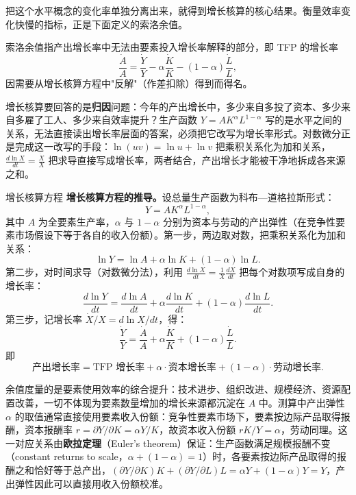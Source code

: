把这个水平概念的变化率单独分离出来，就得到增长核算的核心结果。衡量效率变化快慢的指标，正是下面定义的索洛余值。

\begin{definition}
索洛余值指产出增长率中无法由要素投入增长率解释的部分，即 TFP 的增长率
\[
\frac{\dot A}{A} = \frac{\dot Y}{Y} - \alpha\frac{\dot K}{K} - (1-\alpha)\frac{\dot L}{L},
\]
因需要从增长核算方程中"反解"（作差扣除）得到而得名。
\end{definition}

增长核算要回答的是\textbf{归因}问题：今年的产出增长中，多少来自多投了资本、多少来自多雇了工人、多少来自效率提升？生产函数 $Y = AK^\alpha L^{1-\alpha}$ 写的是水平之间的关系，无法直接读出增长率层面的答案，必须把它改写为增长率形式。对数微分正是完成这一改写的手段：$\ln(uv)=\ln u+\ln v$ 把乘积关系化为加和关系，$\frac{d\ln X}{dt}=\frac{\dot X}{X}$ 把求导直接写成增长率，两者结合，产出增长才能被干净地拆成各来源之和。

\begin{derivation}{增长核算方程}{}
\textbf{增长核算方程的推导。}设总量生产函数为科布—道格拉斯形式：
\[
Y = A K^\alpha L^{1-\alpha},
\]
其中 $A$ 为全要素生产率，$\alpha$ 与 $1-\alpha$ 分别为资本与劳动的产出弹性（在竞争性要素市场假设下等于各自的收入份额）。第一步，两边取对数，把乘积关系化为加和关系：
\[
\ln Y = \ln A + \alpha\ln K + (1-\alpha)\ln L.
\]
第二步，对时间求导（对数微分法），利用 $\frac{d\ln X}{dt} = \frac{1}{X}\frac{dX}{dt}$ 把每个对数项写成自身的增长率：
\[
\frac{d\ln Y}{dt} = \frac{d\ln A}{dt} + \alpha\frac{d\ln K}{dt} + (1-\alpha)\frac{d\ln L}{dt}.
\]
第三步，记增长率 $\dot X/X = d\ln X/dt$，得：
\[
\frac{\dot Y}{Y} = \frac{\dot A}{A} + \alpha\frac{\dot K}{K} + (1-\alpha)\frac{\dot L}{L}.
\]
即
\[
\text{产出增长率} = \text{TFP 增长率} + \alpha\cdot\text{资本增长率} + (1-\alpha)\cdot\text{劳动增长率}.
\]
\end{derivation}

余值度量的是要素使用效率的综合提升：技术进步、组织改进、规模经济、资源配置改善，一切不体现为要素数量增加的增长来源都沉淀在 $A$ 中。测算中产出弹性 $\alpha$ 的取值通常直接使用要素收入份额：竞争性要素市场下，要素按边际产品取得报酬，资本报酬率 $r=\partial Y/\partial K=\alpha Y/K$，故资本收入份额 $rK/Y=\alpha$，劳动同理。这一对应关系由\textbf{欧拉定理}（Euler's theorem）保证：生产函数满足规模报酬不变（constant returns to scale，$\alpha+(1-\alpha)=1$）时，各要素按边际产品取得的报酬之和恰好等于总产出，$(\partial Y/\partial K)K + (\partial Y/\partial L)L = \alpha Y + (1-\alpha)Y = Y$，产出弹性因此可以直接用收入份额校准。

